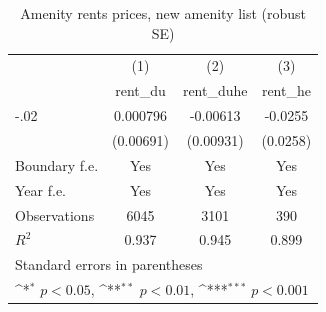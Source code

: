 \begin{table}[htbp]\centering
\def\sym#1{\ifmmode^{#1}\else\(^{#1}\)\fi}
\caption{Amenity rents prices, new amenity list (robust SE)}
\begin{tabular}{l*{3}{c}}
\hline\hline
                    &\multicolumn{1}{c}{(1)}&\multicolumn{1}{c}{(2)}&\multicolumn{1}{c}{(3)}\\
                    &\multicolumn{1}{c}{rent\_du}&\multicolumn{1}{c}{rent\_duhe}&\multicolumn{1}{c}{rent\_he}\\
\hline
-.02                &    0.000796         &    -0.00613         &     -0.0255         \\
                    &   (0.00691)         &   (0.00931)         &    (0.0258)         \\
[1em]
Boundary f.e.       &         Yes         &         Yes         &         Yes         \\
[1em]
Year f.e.           &         Yes         &         Yes         &         Yes         \\
\hline
Observations        &        6045         &        3101         &         390         \\
\(R^{2}\)           &       0.937         &       0.945         &       0.899         \\
\hline\hline
\multicolumn{4}{l}{\footnotesize Standard errors in parentheses}\\
\multicolumn{4}{l}{\footnotesize \sym{*} \(p<0.05\), \sym{**} \(p<0.01\), \sym{***} \(p<0.001\)}\\
\end{tabular}
\end{table}

